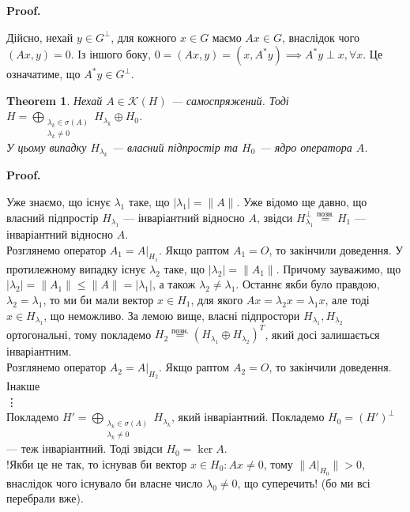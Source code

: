 \documentclass[a4paper, 10pt]{article}
\makeatletter
\theoremstyle{theoremdd}
\newtheorem{theorem}{Theorem}[subsection]
\theoremstyle{theoremdd}
\theoremstyle{theoremdd}
\theoremstyle{theoremdd}
\theoremstyle{theoremdd}
\theoremstyle{theoremdd}
\theoremstyle{theoremdd}
\theoremstyle{theoremdd}
\renewenvironment{proof}[1][Proof.\\]{\par
\pushQED{\hfill \qed}%
\normalfont \topsep6\p@\@plus6\p@\relax
\trivlist
\item\relax
{\bfseries
#1\@addpunct{.}}\hspace\labelsep\ignorespaces
}{%
\popQED\endtrivlist\@endpefalse
}
\makeatother
\begin{document}
\begin{proof}
Дійсно, нехай $y \in G^\perp$, для кожного $x \in G$ маємо $Ax \in G$, внаслідок чого $(Ax,y) = 0$. Із іншого боку, $0 = (Ax,y) = (x, A^*y) \implies A^*y \perp x, \forall x$. Це означатиме, що $A^*y \in G^\perp$.
\end{proof}

\begin{theorem}
Нехай $A \in \mathcal{K}(H)$ --- самоспряжений. Тоді $H = \displaystyle\bigoplus_{\substack{\lambda_k \in \sigma(A) \\ \lambda_k \ne 0 }} H_{\lambda_k} \oplus H_0$.\\
У цьому випадку $H_{\lambda_k}$ --- власний підпростір та $H_0$ --- ядро оператора $A$.
\end{theorem}

\begin{proof}
Уже знаємо, що існує $\lambda_1$ таке, що $|\lambda_1| = \|A\|$. Уже відомо ще давно, що власний підпростір $H_{\lambda_1}$ --- інваріантний відносно $A$, звідси $H_{\lambda_1}^\perp \overset{\text{позн.}}{=} H_1$ --- інваріантний відносно $A$.\\
Розглянемо оператор $A_1 = A|_{H_1}$. Якщо раптом $A_1 = O$, то закінчили доведення. У протилежному випадку існує $\lambda_2$ таке, що $|\lambda_2| = \|A_1\|$. Причому зауважимо, що $|\lambda_2| = \|A_1\| \leq \|A\| = |\lambda_1|$, а також $\lambda_2 \neq \lambda_1$. Останнє якби було правдою, $\lambda_2 = \lambda_1$, то ми би мали вектор $x \in H_1$, для якого $Ax = \lambda_2 x = \lambda_1 x$, але тоді $x \in H_{\lambda_1}$, що неможливо. За лемою вище, власні підпростори $H_{\lambda_1}, H_{\lambda_2}$ ортогональні, тому покладемо $H_2 \overset{\text{позн.}}{=} \left(H_{\lambda_1} \oplus H_{\lambda_2}\right)^T$, який досі залишається інваріантним.\\
Розглянемо оператор $A_2 = A|_{H_2}$. Якщо раптом $A_2 = O$, то закінчили доведення. Інакше\\
\vdots \\
Покладемо $H' = \displaystyle\bigoplus_{\substack{\lambda_k \in \sigma(A) \\ \lambda_k \ne 0 }} H_{\lambda_k}$, який інваріантний. Покладемо $H_0 = (H')^\perp$ --- теж інваріантний. Тоді звідси $H_0 = \ker A$.\\
!Якби це не так, то існував би вектор $x \in H_0: Ax \neq 0$, тому $\|A|_{H_0}\| > 0$, внаслідок чого існувало би власне число $\lambda_0 \neq 0$, що суперечить! (бо ми всі перебрали вже).
\end{proof}
\newpage
\end{document}

